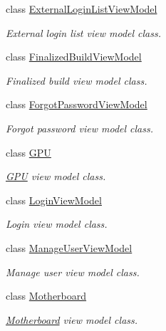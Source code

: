 \begin{DoxyCompactItemize}
class \hyperlink{class_p_c_builder_m_v_c_1_1_models_1_1_external_login_list_view_model}{External\+Login\+List\+View\+Model}
\begin{DoxyCompactList}\small\item\em External login list view model class. \end{DoxyCompactList}\item 
class \hyperlink{class_p_c_builder_m_v_c_1_1_models_1_1_finalized_build_view_model}{Finalized\+Build\+View\+Model}
\begin{DoxyCompactList}\small\item\em Finalized build view model class. \end{DoxyCompactList}\item 
class \hyperlink{class_p_c_builder_m_v_c_1_1_models_1_1_forgot_password_view_model}{Forgot\+Password\+View\+Model}
\begin{DoxyCompactList}\small\item\em Forgot password view model class. \end{DoxyCompactList}\item 
class \hyperlink{class_p_c_builder_m_v_c_1_1_models_1_1_g_p_u}{G\+PU}
\begin{DoxyCompactList}\small\item\em \hyperlink{class_p_c_builder_m_v_c_1_1_models_1_1_g_p_u}{G\+PU} view model class. \end{DoxyCompactList}\item 
class \hyperlink{class_p_c_builder_m_v_c_1_1_models_1_1_login_view_model}{Login\+View\+Model}
\begin{DoxyCompactList}\small\item\em Login view model class. \end{DoxyCompactList}\item 
class \hyperlink{class_p_c_builder_m_v_c_1_1_models_1_1_manage_user_view_model}{Manage\+User\+View\+Model}
\begin{DoxyCompactList}\small\item\em Manage user view model class. \end{DoxyCompactList}\item 
class \hyperlink{class_p_c_builder_m_v_c_1_1_models_1_1_motherboard}{Motherboard}
\begin{DoxyCompactList}\small\item\em \hyperlink{class_p_c_builder_m_v_c_1_1_models_1_1_motherboard}{Motherboard} view model class. \end{DoxyCompactList}\item 

\end{DoxyCompactItemize}
